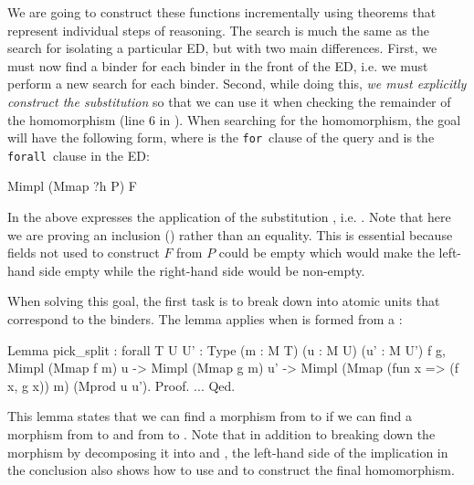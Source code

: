 \documentclass[preprint]{sigplanconf}
\newcommand{\FOR}{{\tt for}\relax\ifmmode\ \else\xspace\fi}
\newcommand{\FORALL}{{\tt forall}\relax\ifmmode\ \else\xspace\fi}
\begin{document}
We are going to construct these functions incrementally using theorems that represent individual steps of reasoning.
The search is much the same as the search for isolating a particular ED, but with two main differences.
First, we must now find a binder for each binder in the front of the ED, i.e. we must perform a new search for each binder.
Second, while doing this, \emph{we must explicitly construct the substitution } so that we can use it when checking the remainder of the homomorphism (line 6 in ).
When searching for the homomorphism, the goal will have the following form, where  is the \FOR clause of the query and  is the \FORALL clause in the ED:
\begin{coq}
Mimpl (Mmap ?h P) F
\end{coq}
In the above %
 expresses the application of the substitution , i.e. .
Note that here we are proving an inclusion () rather than an equality.
This is essential because fields not used to construct $F$ from $P$ could be empty which would make the left-hand side empty while the right-hand side would be non-empty.

When solving this goal, the first task is to break  down into atomic units that correspond to the binders.
The  lemma applies when  is formed from a :
\begin{coq}
Lemma pick_split
: forall {T U U' : Type} (m : M T) (u : M U) (u' : M U') f g,
  Mimpl (Mmap f m) u ->
  Mimpl (Mmap g m) u' ->
  Mimpl (Mmap (fun x => (f x, g x)) m) (Mprod u u').
Proof. ... Qed.
\end{coq}
This lemma states that we can find a morphism from  to  if we can find a morphism from  to  and from  to .
Note that in addition to breaking down the morphism by decomposing it into  and , the left-hand side of the implication in the conclusion also shows how to use  and  to construct the final homomorphism.
\end{document}
